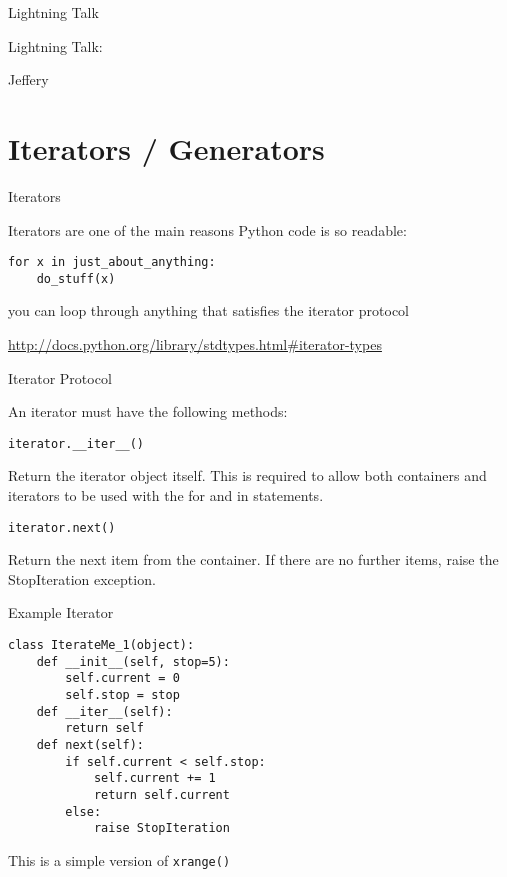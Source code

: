 \documentclass{beamer}
\begin{document}
\begin{frame}{Lightning Talk}

{\centering

\vfill
{\LARGE Lightning Talk:  }

\vfill
{\Huge Jeffery}

\vfill
}
\end{frame}

\section{Iterators / Generators}

\begin{frame}[fragile]{Iterators}

{\Large Iterators are one of the main reasons Python code is so readable:}

\begin{verbatim}
for x in just_about_anything:
    do_stuff(x)
\end{verbatim}

{\Large you can loop through anything that satisfies the iterator protocol}

\vfill
\url{http://docs.python.org/library/stdtypes.html#iterator-types}
\end{frame} 

\begin{frame}[fragile]{Iterator Protocol}

{\Large An iterator must have the following methods:}

\begin{verbatim}
iterator.__iter__()
\end{verbatim}

Return the iterator object itself. This is required to allow both containers
and iterators to be used with the for and in statements.

\begin{verbatim}
iterator.next()
\end{verbatim}

Return the next item from the container. If there are no further items,
raise the StopIteration exception.

\end{frame} 


\begin{frame}[fragile]{Example Iterator}

\begin{verbatim}
class IterateMe_1(object):
    def __init__(self, stop=5):
        self.current = 0
        self.stop = stop
    def __iter__(self):
        return self
    def next(self):
        if self.current < self.stop:
            self.current += 1
            return self.current
        else:
            raise StopIteration
\end{verbatim}

{\Large This is a simple version of \verb|xrange()|}

\end{frame} 
\end{document}
